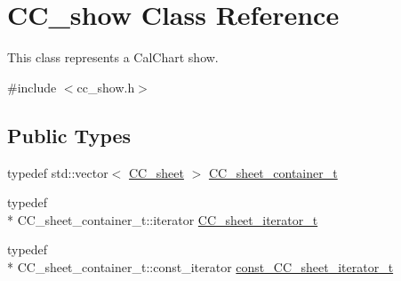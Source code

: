 \hypertarget{a00046}{\section{C\-C\-\_\-show Class Reference}
\label{a00046}
}


This class represents a Cal\-Chart show.  




{\ttfamily \#include $<$cc\-\_\-show.\-h$>$}

\subsection*{Public Types}
\begin{DoxyCompactItemize}
\item 
typedef std\-::vector$<$ \hyperlink{a00045}{C\-C\-\_\-sheet} $>$ \hyperlink{a00046_a1a6e11ead9a97c796881971059c56f37}{C\-C\-\_\-sheet\-\_\-container\-\_\-t}
\item 
typedef \\*
C\-C\-\_\-sheet\-\_\-container\-\_\-t\-::iterator \hyperlink{a00046_a53c7d0b304ced90d330ea5076f1bee89}{C\-C\-\_\-sheet\-\_\-iterator\-\_\-t}
\item 
typedef \\*
C\-C\-\_\-sheet\-\_\-container\-\_\-t\-::const\-\_\-iterator \hyperlink{a00046_aaaf1345012d2f833d1c8f28f9b8593ff}{const\-\_\-\-C\-C\-\_\-sheet\-\_\-iterator\-\_\-t}
\end{DoxyCompactItemize}
